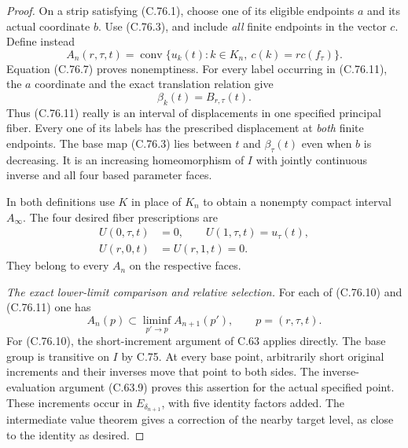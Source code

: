 \begin{proof}
On a strip satisfying (C.76.1), choose one of its eligible
endpoints $a$ and its actual coordinate $b$. Use (C.76.3),
and include \emph{all} finite endpoints in the vector $c$.
Define instead
\[
 A_n(r,\tau,t)=\operatorname{conv}
       \{u_k(t):k\in K_n,\ c(k)=r c(f_\tau)\}.
                                                               \tag{C.76.11}
\]
Equation (C.76.7) proves nonemptiness. For every label
occurring in (C.76.11), the $a$ coordinate and the exact
translation relation give
\[
                       \beta_k(t)=B_{r,\tau}(t).
                                                               \tag{C.76.12}
\]
Thus (C.76.11) really is an interval of displacements
in one specified principal fiber. Every one of its
labels has the prescribed displacement at \emph{both}
finite endpoints. The base map (C.76.3) lies between
$t$ and $\beta_\tau(t)$ even when $b$ is decreasing.
It is an increasing homeomorphism of $I$ with jointly
continuous inverse and all four based parameter faces.

In both definitions use $K$ in place of $K_n$ to obtain
a nonempty compact interval $A_\infty$. The four desired
fiber prescriptions are
\[
 \begin{split}
 U(0,\tau,t)&=0,\qquad U(1,\tau,t)=u_\tau(t),\\
 U(r,0,t)&=U(r,1,t)=0.
 \end{split}                                                   \tag{C.76.13}
\]
They belong to every $A_n$ on the respective faces.

\emph{The exact lower-limit comparison and relative selection.}
For each of (C.76.10) and (C.76.11) one has
\[
 A_n(p)\subset\liminf_{p'\to p}A_{n+1}(p'),
                     \qquad p=(r,\tau,t).
                                                               \tag{C.76.14}
\]
For (C.76.10), the short-increment argument of C.63 applies
directly. The base group is transitive on $I$ by C.75.
At every base point, arbitrarily short original increments
and their inverses move that point to both sides. The
inverse-evaluation argument (C.63.9) proves this assertion
for the actual specified point. These increments occur
in $E_{\delta_{n+1}}$, with five identity factors added.
The intermediate value theorem gives a correction of the
nearby target level, as close to the identity as desired.


\end{proof}
